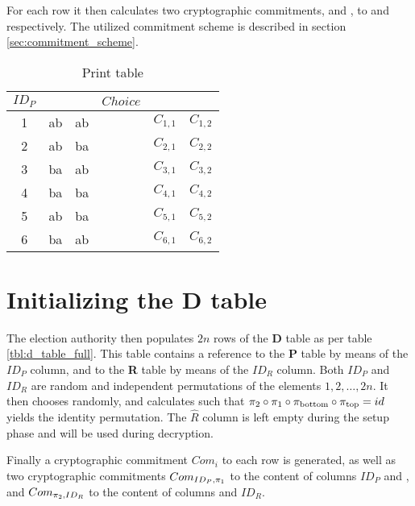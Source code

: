 For each row it then calculates two cryptographic commitments, \ctop{} and
\cbottom{}, to \ptop{} and \pbottom{} respectively. The utilized commitment
scheme is described in section \ref{sec:commitment_scheme}.

\begin{table}
	\centering
	\begin{tabular}{|c|c|c|c|c|c|}
		\hline
		$ID_P$ & \ptop & \pbottom & $Choice$ & \ctop & \cbottom \\
		\hline
		1 & ab & ab & & $C_{1, 1}$ & $C_{1, 2}$ \\
		2 & ab & ba & & $C_{2, 1}$ & $C_{2, 2}$ \\
		3 & ba & ab & & $C_{3, 1}$ & $C_{3, 2}$ \\
		4 & ba & ba & & $C_{4, 1}$ & $C_{4, 2}$ \\
		5 & ab & ba & & $C_{5, 1}$ & $C_{5, 2}$ \\
		6 & ba & ab & & $C_{6, 1}$ & $C_{6, 2}$ \\
		\hline
	\end{tabular}
	\caption{Print table}
	\label{tbl:p_table_full}
\end{table}

\section{Initializing the \textbf{D} table}

The election authority then populates $2n$ rows of the \textbf{D} table as per
table \ref{tbl:d_table_full}. This table contains a reference to the \textbf{P}
table by means of the $ID_P$ column, and to the \textbf{R} table by means of
the $ID_R$ column. Both $ID_P$ and $ID_R$ are random and independent
permutations of the elements $1, 2, \ldots, 2n$. It then chooses \pone{}
randomly, and calculates \ptwo{} such that $\pi_2 \circ \pi_1 \circ \pi_{\text{bottom}}
\circ \pi_{\text{top}} = id$ yields the identity permutation.  The $\hat{R}$ column is
left empty during the setup phase and will be used during decryption. 

Finally a  cryptographic commitment $Com_i$ to each row is generated, as well
as two cryptographic commitments $Com_{ID_P, \pi_1}$ to the content of columns
$ID_P$ and \pone{}, and $Com_{\pi_2, ID_R}$ to the content of columns \ptwo{}
and $ID_R$.

